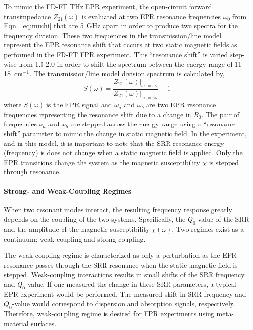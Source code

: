 To mimic the FD-FT THz EPR experiment, the open-circuit forward transimpedance $Z_{21}(\omega)$ is evaluated at two EPR resonance frequencies $\omega_0$ from Eqn.~\ref{eq:muchi} that are 5~GHz apart in order to produce two spectra for the frequency division. These two frequencies in the transmission\-/line model represent the EPR resonance shift that occurs at two static magnetic fields as performed in the FD-FT EPR experiment. This ``resonance shift'' is varied step-wise from 1.0-2.0 in order to shift the spectrum between the energy range of 11-18~cm$^{-1}$. The transmission\-/line model division spectrum is calculated by, 
\begin{equation}
    S(\omega) = \frac{Z_{21}(\omega)\Bigr\rvert_{\omega_0 = \omega_a}}{Z_{21}(\omega)\Bigr\rvert_{\omega_0 = \omega_b}} - 1
\end{equation}
where $S(\omega)$ is the EPR signal and $\omega_a$ and $\omega_b$ are two EPR resonance frequencies representing the resonance shift due to a change in $B_0$. The pair of frequencies $\omega_a$ and $\omega_b$ are stepped across the energy range using a ``resonance shift'' parameter to mimic the change in static magnetic field. In the experiment, and in this model, it is important to note that the SRR resonance energy (frequency) is does not change when a static magnetic field is applied. Only the EPR transitions change the system as the magnetic susceptibility $\chi$ is stepped through resonance.

\noindent \paragraph*{Strong- and Weak-Coupling Regimes}
When two resonant modes interact, the resulting frequency response greatly depends on the coupling of the two systems. Specifically, the $Q_0$-value of the SRR and the amplitude of the magnetic susceptibility $\chi(\omega)$. Two regimes exist as a continuum: weak-coupling and strong-coupling. 

The weak-coupling regime is characterized as only a perturbation as the EPR resonance passes through the SRR resonance when the static magnetic field is stepped. Weak-coupling interactions results in small shifts of the SRR frequency and $Q_0$-value. If one measured the change in these SRR parameters, a typical EPR experiment would be performed. The measured shift in SRR frequency and $Q_0$-value would correspond to dispersion and absorption signals, respectively. \cite{abragam1961, poole} Therefore, weak-coupling regime is desired for EPR experiments using meta-material surfaces.

